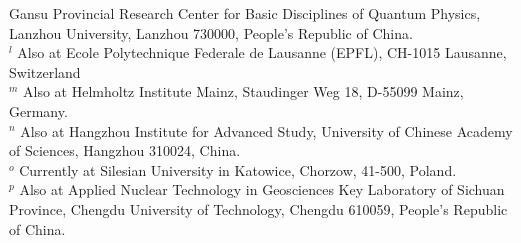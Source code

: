 \documentclass[aps,amsmath,amssymb,reprint]{revtex4-2}
\begin{document}
\begin{widetext}
\begin{center}
{Gansu Provincial Research Center for Basic Disciplines of Quantum Physics,
Lanzhou University, Lanzhou 730000, People's Republic of China.\\
$^{l}$ Also at Ecole Polytechnique Federale de Lausanne (EPFL), CH-1015 Lausanne, Switzerland\\
$^{m}$ Also at Helmholtz Institute Mainz, Staudinger Weg 18, D-55099 Mainz, Germany.\\
$^{n}$ Also at Hangzhou Institute for Advanced Study, University of Chinese Academy of Sciences, Hangzhou 310024, China.\\
$^{o}$ Currently at Silesian University in Katowice, Chorzow, 41-500, Poland.\\
$^{p}$ Also at Applied Nuclear Technology in Geosciences Key Laboratory of Sichuan Province, Chengdu University of Technology, Chengdu 610059, People's Republic of China.\\
}

\end{center}
\end{widetext}
\end{document}

